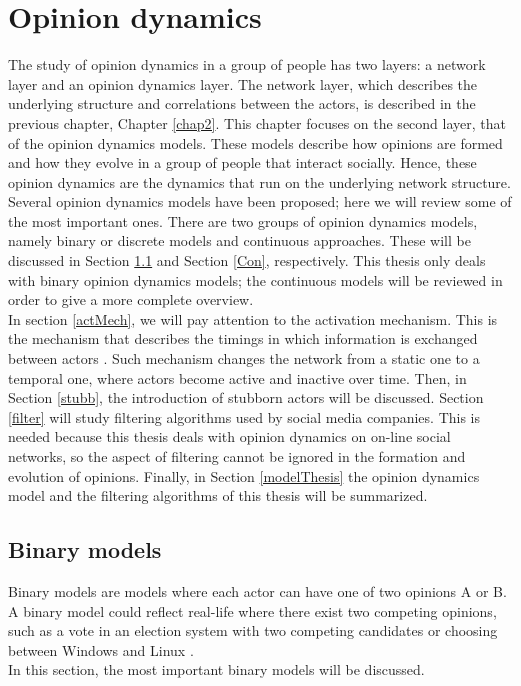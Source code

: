 \documentclass[11 pt , letterpaper , twoside , openright]{book}
\begin{document}
\chapter{Opinion dynamics}
\label{chap3}
The study of opinion dynamics in a group of people has two layers: a network layer and an opinion dynamics layer. The network layer, which describes the underlying structure and correlations between the actors, is described in the previous chapter, Chapter \ref{chap2}. This chapter focuses on the second layer, that of the opinion dynamics models. These models describe how opinions are formed and how they evolve in a group of people that interact socially. Hence, these opinion dynamics are the dynamics that run on the underlying network structure.\\
\newline
Several opinion dynamics models have been proposed; here we will review some of the most important ones. There are two groups of opinion dynamics models, namely binary or discrete models and continuous approaches. These will be discussed in Section \ref{Bin} and Section \ref{Con}, respectively. This thesis only deals with binary opinion dynamics models; the continuous models will be reviewed in order to give a more complete overview.\\
\newline
In section \ref{actMech}, we will pay attention to the activation mechanism. This is the mechanism that describes the timings in which information is exchanged between actors \cite{Perra2019}. Such mechanism changes the network from a static one to a temporal one, where actors become active and inactive over time. Then, in Section \ref{stubb}, the introduction of stubborn actors will be discussed. Section \ref{filter} will study filtering algorithms used by social media companies. This is needed because this thesis deals with opinion dynamics on on-line social networks, so the aspect of filtering cannot be ignored in the formation and evolution of opinions. Finally, in Section \ref{modelThesis} the opinion dynamics model and the filtering algorithms of this thesis will be summarized.

\section{Binary models}\label{Bin}

Binary models are models where each actor can have one of two opinions A or B. A binary model could reflect real-life where there exist two competing opinions, such as a vote in an election system with two competing candidates or choosing between Windows and Linux \cite{Nguyen2020}.\\
\newline
In this section, the most important binary models will be discussed.
\end{document}
